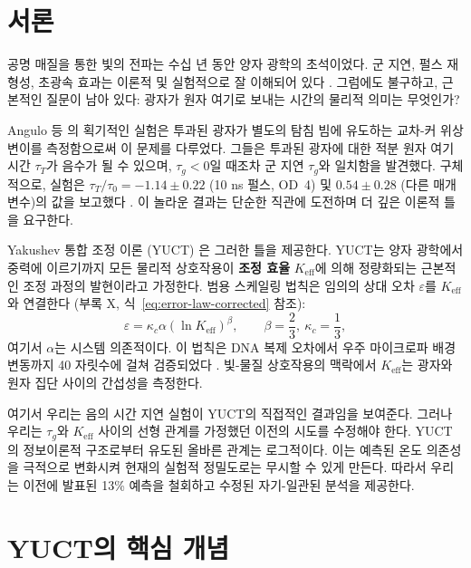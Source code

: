 \documentclass[12pt,a4paper]{article}
\newcommand{\Keff}{K_{\mathrm{eff}}}
\newcommand{\kappac}{\kappa_c}
\newcommand{\eps}{\varepsilon}
\newcommand{\betac}{\beta}
\begin{document}
	\tableofcontents
	\newpage
	
	\section{서론}
	
	공명 매질을 통한 빛의 전파는 수십 년 동안 양자 광학의 초석이었다. 군 지연, 펄스 재형성, 초광속 효과는 이론적 및 실험적으로 잘 이해되어 있다 \cite{Brillouin1960, Milonni2004}. 그럼에도 불구하고, 근본적인 질문이 남아 있다: 광자가 원자 여기로 보내는 시간의 물리적 의미는 무엇인가?
	
	Angulo 등 \cite{Angulo2024}의 획기적인 실험은 투과된 광자가 별도의 탐침 빔에 유도하는 교차-커 위상 변이를 측정함으로써 이 문제를 다루었다. 그들은 투과된 광자에 대한 적분 원자 여기 시간 \(\tau_T\)가 음수가 될 수 있으며, \(\tau_g < 0\)일 때조차 군 지연 \(\tau_g\)와 일치함을 발견했다. 구체적으로, 실험은 \(\tau_T/\tau_0 = -1.14 \pm 0.22\) (10 ns 펄스, OD~4) 및 \(0.54 \pm 0.28\) (다른 매개변수)의 값을 보고했다 \cite{Angulo2024, Nixon2024}. 이 놀라운 결과는 단순한 직관에 도전하며 더 깊은 이론적 틀을 요구한다.
	
	Yakushev 통합 조정 이론 (YUCT) \cite{Yakushev2026a}은 그러한 틀을 제공한다. YUCT는 양자 광학에서 중력에 이르기까지 모든 물리적 상호작용이 \textbf{조정 효율} \(\Keff\)에 의해 정량화되는 근본적인 조정 과정의 발현이라고 가정한다. 범용 스케일링 법칙은 임의의 상대 오차 \(\eps\)를 \(\Keff\)와 연결한다 (부록 X, 식~\ref{eq:error-law-corrected} 참조):
	\begin{equation}
		\eps = \kappac \alpha (\ln\Keff)^{\betac}, \qquad \betac = \frac{2}{3},\ \kappac = \frac{1}{3},
		\label{eq:scaling}
	\end{equation}
	여기서 \(\alpha\)는 시스템 의존적이다. 이 법칙은 DNA 복제 오차에서 우주 마이크로파 배경 변동까지 40 자릿수에 걸쳐 검증되었다 \cite{Yakushev2026c}. 빛-물질 상호작용의 맥락에서 \(\Keff\)는 광자와 원자 집단 사이의 간섭성을 측정한다.
	
	여기서 우리는 음의 시간 지연 실험이 YUCT의 직접적인 결과임을 보여준다. 그러나 우리는 \(\tau_g\)와 \(\Keff\) 사이의 선형 관계를 가정했던 이전의 시도를 수정해야 한다. YUCT의 정보이론적 구조로부터 유도된 올바른 관계는 로그적이다. 이는 예측된 온도 의존성을 극적으로 변화시켜 현재의 실험적 정밀도로는 무시할 수 있게 만든다. 따라서 우리는 이전에 발표된 13\% 예측을 철회하고 수정된 자기-일관된 분석을 제공한다.
	
	\section{YUCT의 핵심 개념}
	
\end{document}
